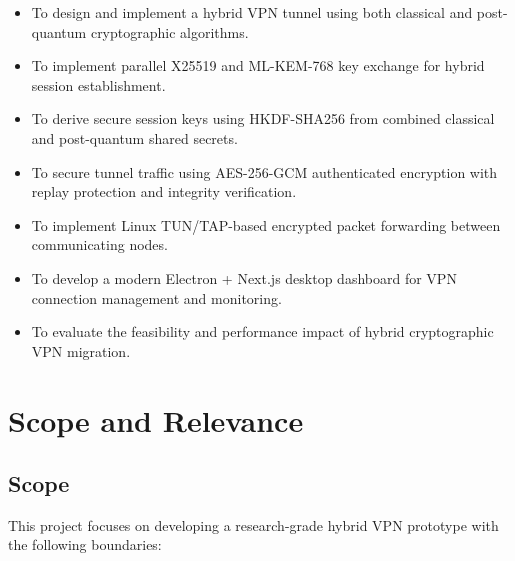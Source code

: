 \begin{itemize}

    \item To design and implement a hybrid VPN tunnel using both classical and post-quantum cryptographic algorithms.

    \item To implement parallel X25519 and ML-KEM-768 key exchange for hybrid session establishment.

    \item To derive secure session keys using HKDF-SHA256 from combined classical and post-quantum shared secrets.

    \item To secure tunnel traffic using AES-256-GCM authenticated encryption with replay protection and integrity verification.

    \item To implement Linux TUN/TAP-based encrypted packet forwarding between communicating nodes.

    \item To develop a modern Electron + Next.js desktop dashboard for VPN connection management and monitoring.

    \item To evaluate the feasibility and performance impact of hybrid cryptographic VPN migration.

\end{itemize}

\section{Scope and Relevance}

\subsection*{Scope}

This project focuses on developing a research-grade hybrid VPN prototype with the following boundaries:

